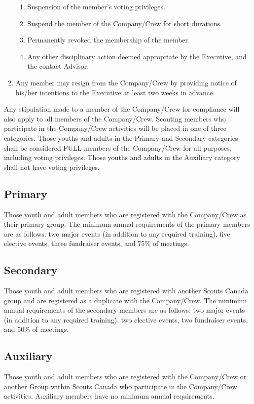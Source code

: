 \begin{enumerate}
    \begin{enumerate}
        \item Suspension of the member's voting privileges.
        \item Suspend the member of the Company/Crew for short durations.
        \item Permanently revoked the membership of the member.
        \item Any other disciplinary action deemed appropriate by the Executive, and the contact Advisor.
    \end{enumerate}
    \item Any member may resign from the Company/Crew by providing notice of his/her intentions to the Executive at least two weeks in advance.
\end{enumerate}
Any stipulation made to a member of the Company/Crew for compliance will also apply to all members of the Company/Crew.
Scouting members who participate in the Company/Crew activities will be placed in one of three categories.
Those youths and adults in the Primary and Secondary categories shall be considered FULL members of the Company/Crew for all purposes, including voting privileges.
Those youths and adults in the Auxiliary category shall not have voting privileges.

\subsection{Primary}\label{subsec:primary}
Those youth and adult members who are registered with the Company/Crew as their primary group.
The minimum annual requirements of the primary members are as follows: two major events (in addition to any required training), five elective events, three fundraiser events, and 75\% of meetings.

\subsection{Secondary}\label{subsec:secondary}
Those youth and adult members who are registered with another Scouts Canada group and are registered as a duplicate with the Company/Crew.
The minimum annual requirements of the secondary members are as follows: two major events (in addition to any required training), two elective events, two fundraiser events, and 50\% of meetings.

\subsection{Auxiliary}\label{subsec:auxiliary}
Those youth and adult members who are registered with the Company/Crew or another Group within Scouts Canada who participate in the Company/Crew activities.
Auxiliary members have no minimum annual requirements.
